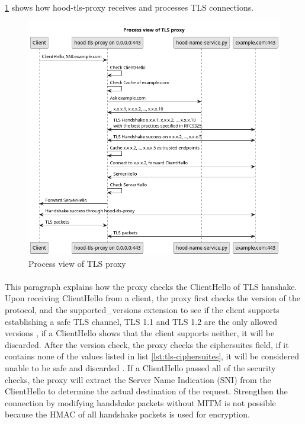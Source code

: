 \documentclass[mscthesis]{usiinfthesis}
\begin{document}
\paragraph{}
\cref{fig:tls-proxy-process-view} shows how hood-tls-proxy receives and processes TLS connections.
\begin{figure}[H]
  \includegraphics[width=\textwidth]{graphics/puml/process-tls-proxy.png}
  \caption{Process view of TLS proxy}
  \label{fig:tls-proxy-process-view}
\end{figure}

\paragraph{}
This paragraph explains how the proxy checks the ClientHello of TLS hanshake. Upon receiving ClientHello from a client, the proxy first checks the version of the protocol, and the supported\_versions extension to see if the client supports establishing a safe TLS channel, TLS 1.1 and TLS 1.2 are the only allowed versions \citep{rfc:bstprc}, if a ClientHello shows that the client supports neither, it will be discarded. After the version check, the proxy checks the ciphersuites field, if it contains none of the values listed in list \ref{lst:tls-ciphersuites}, it will be considered unable to be safe and discarded \citep{rfc:bstprc}. If a ClientHello passed all of the security checks, the proxy will extract the Server Name Indication (SNI) from the ClientHello to determine the actual destination of the request. Strengthen the connection by modifying handshake packets without MITM is not possible because the HMAC of all handshake packets is used for encryption.
\end{document}
